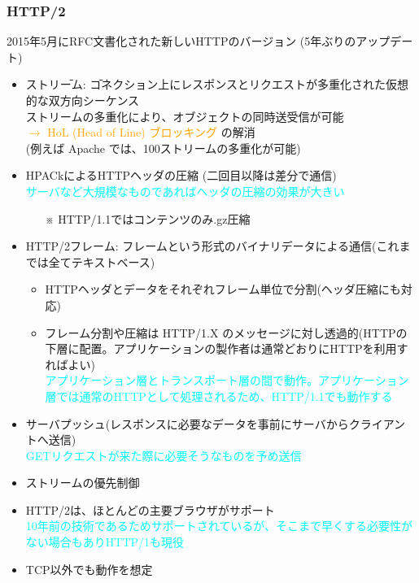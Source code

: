 \subsubsection{HTTP/2}

2015年5月にRFC文書化された新しいHTTPのバージョン (5年ぶりのアップデート)

\begin{itemize}
  \item \begin{tabbing}ストリ\=ーム: \=コネクション上にレスポンスとリクエストが多重化された仮想的な双方向シーケンス\\
      \>ストリームの多重化により、オブジェクトの同時送受信が可能\\
      \>\>\textcolor{orange}{$\rightarrow$ HoL (Head of Line) ブロッキング} \footnotemark の解消\\  %
    \>(例えば Apache では、100ストリームの多重化が可能)
  \end{tabbing}
  \item HPACkによるHTTPヘッダの圧縮 (二回目以降は差分で通信)\\
  \textcolor{cyan}{サーバなど大規模なものであればヘッダの圧縮の効果が大きい}
  \begin{itemize}
    \item[※] HTTP/1.1ではコンテンツのみ.gz圧縮
  \end{itemize}
  \item HTTP/2フレーム: フレームという形式のバイナリデータによる通信(これまでは全てテキストベース)
  \begin{itemize}
    \item HTTPヘッダとデータをそれぞれフレーム単位で分割(ヘッダ圧縮にも対応)
    \item フレーム分割や圧縮は HTTP/1.X のメッセージに対し透過的(HTTPの下層に配置。アプリケーションの製作者は通常どおりにHTTPを利用すればよい)\\
    \textcolor{cyan}{アプリケーション層とトランスポート層の間で動作。アプリケーション層では通常のHTTPとして処理されるため、HTTP/1.1でも動作する}
  \end{itemize}
  \item サーバプッシュ(レスポンスに必要なデータを事前にサーバからクライアントへ送信)\\
  \textcolor{cyan}{GETリクエストが来た際に必要そうなものを予め送信}
  \item ストリームの優先制御
  \item HTTP/2は、ほとんどの主要ブラウザがサポート\\
  \textcolor{cyan}{10年前の技術であるためサポートされているが、そこまで早くする必要性がない場合もありHTTP/1も現役}
  \item TCP以外でも動作を想定
\end{itemize}


